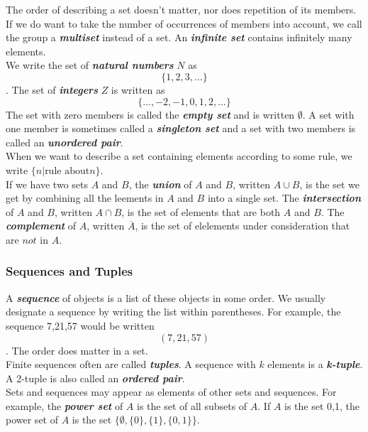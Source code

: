 \documentclass{article}
\theoremstyle{definition}
\newcommand{\define}[1]{\textbf{\textit{#1}}}
\begin{document}
The order of describing a set doesn't matter, nor does repetition of its members. If we do want to take the number of occurrences of members into account, we call the group a \define{multiset} instead of a set. An \define{infinite set} contains infinitely many elements. \\ 

We write the set of \define{natural numbers} $N$ as $$\{1,2,3,\dots\}$$. The set of \define{integers} $Z$ is written as $$\{\dots,-2,-1,0,1,2,\dots\}$$ The set with zero members is called the \define{empty set} and is written $\emptyset$. A set with one member is sometimes called a \define{singleton set} and a set with two members is called an \define{unordered pair}. \\ 

When we want to describe a set containing elements according to some rule, we write $\{n \vert \textrm{rule about} n\}$. \\ 

If we have two sets $A$ and $B$, the \define{union} of $A$ and $B$, written $A \cup B$, is the set we get by combining all the leements in $A$ and $B$ into a single set. The \define{intersection} of $A$ and $B$, written $A \cap B$, is the set of elements that are both $A$ and $B$. The \define{complement} of $A$, written $\overline{A}$, is the set of elelements under consideration that are $not$ in $A$. \\ 

\subsubsection{Sequences and Tuples}

A \define{sequence} of objects is a list of these objects in some order. We usually designate a sequence by writing the list within parentheses. For example, the sequence 7,21,57 would be written $$(7,21,57)$$. The order does matter in a set. \\ 

Finite sequences often are called \define{tuples}. A sequence with $k$ elements is a \define{k-tuple}. A 2-tuple is also called an \define{ordered pair}. \\ 

Sets and sequences may appear as elements of other sets and sequences. For example, the \define{power set} of $A$ is the set of all subsets of $A$. If $A$ is the set {0,1}, the power set of $A$ is the set $\{\emptyset, \{0\}, \{1\}, \{0,1\}\}$. \\ 
\end{document}
